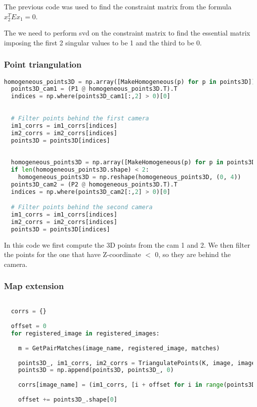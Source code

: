 \documentclass{ETHExercise}
\begin{document}
The previous code was used to find the constraint matrix from 
the formula $x_2^T E x_1 = 0$.

The we need to perform svd on the constraint matrix to find
the essential matrix imposing the first 2 singular values 
to be 1 and the third to be 0.

\subsubsection{Point triangulation}

\begin{lstlisting}[language=Python, caption=point triangulation]
  homogeneous_points3D = np.array([MakeHomogeneous(p) for p in points3D])
  points3D_cam1 = (P1 @ homogeneous_points3D.T).T
  indices = np.where(points3D_cam1[:,2] > 0)[0]
  
  
  # Filter points behind the first camera
  im1_corrs = im1_corrs[indices]
  im2_corrs = im2_corrs[indices]
  points3D = points3D[indices]
  
  
  homogeneous_points3D = np.array([MakeHomogeneous(p) for p in points3D])
  if len(homogeneous_points3D.shape) < 2:
    homogeneous_points3D = np.reshape(homogeneous_points3D, (0, 4))
  points3D_cam2 = (P2 @ homogeneous_points3D.T).T
  indices = np.where(points3D_cam2[:,2] > 0)[0]

  # Filter points behind the second camera
  im1_corrs = im1_corrs[indices]
  im2_corrs = im2_corrs[indices]
  points3D = points3D[indices]

\end{lstlisting}

In this code we first compute the 3D points from the cam 1 and 2. We then filter
the points for the one that have Z-coordinate $<$ 0, so they are behind 
the camera.

\subsubsection{Map extension}

\begin{lstlisting}[language=Python, caption=Trinagulate images]

  corrs = {}
  
  offset = 0
  for registered_image in registered_images:
    
    m = GetPairMatches(image_name, registered_image, matches)
    
    points3D_, im1_corrs, im2_corrs = TriangulatePoints(K, image, images[registered_image], m)
    points3D = np.append(points3D, points3D_, 0)
    
    corrs[image_name] = (im1_corrs, [i + offset for i in range(points3D_.shape[0])])
    
    offset += points3D_.shape[0]
\end{lstlisting}
\end{document}

